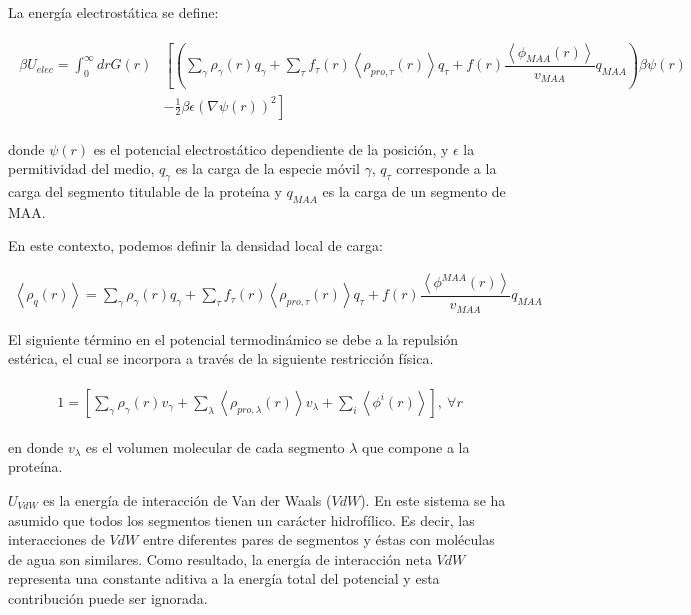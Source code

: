 
La energ\'ia electrost\'atica se define:

\begin{align}
	\begin{aligned}
		\beta U_{elec}= \int_0^\infty drG(r)&\left[\left(\sum_{\gamma } {\rho_\gamma(r) q_\gamma + \sum_\tau{f_\tau(r) \left<\rho_{pro,\tau}(r)\right> q_\tau} +  f(r)\dfrac{\left<\phi_{MAA}(r)\right>}{v_{MAA}}q_{MAA}}\right)\beta\psi(r) \right. \\ &\left.-\frac{1}{2}\beta\epsilon(\nabla\psi(r))^2 \right]
	\end{aligned}
\end{align} 

\noindent donde $\psi(r)$ es el potencial electrost\'atico dependiente de la posici\'on, y $\epsilon$ la permitividad del medio, $q_\gamma$ es la carga de la especie m\'ovil $\gamma$, $q_\tau$ corresponde a la carga del segmento titulable de la prote\'ina y $q_{MAA}$ es la carga de un segmento de MAA.

En este contexto, podemos definir la densidad local de carga: 

\begin{align}
	\left<\rho_q(r)\right> = \sum_{\gamma } {\rho_\gamma(r) q_\gamma + \sum_\tau{f_\tau(r) \left<\rho_{pro,\tau}(r)\right> q_\tau} +  f(r)\dfrac{\left<\phi^{MAA}(r)\right>}{v_{MAA}}q_{MAA}}
	\label{eq:esf:rho-charge}
\end{align}  
             
El siguiente t\'ermino en el potencial termodin\'amico se debe a la repulsi\'on est\'erica, el cual se incorpora a trav\'es de la siguiente restricci\'on f\'isica.

\begin{align}
	\begin{aligned}
		1=  {\left[\sum_{\gamma}\rho_\gamma(r) v_\gamma + \sum_\lambda{\left<\rho_{pro,\lambda}(r)\right>v_\lambda} + \sum_i{\left<\phi^i(r)\right>}\right]},~ \forall r
	\end{aligned}
	\label{eq:esf:constraint}
\end{align}


\noindent en donde $v_\lambda$  es el volumen molecular de cada segmento $\lambda$  que compone a la prote\'ina.



$U_{VdW}$ es la energ\'ia de interacci\'on de Van der Waals ($VdW$). En este sistema se ha asumido que todos los segmentos tienen un car\'acter hidrof\'ilico. Es decir, las interacciones de $VdW$ entre diferentes pares de segmentos y \'estas con mol\'eculas de agua son similares. Como resultado, la energ\'ia de interacci\'on neta $VdW$ representa una constante aditiva a la energ\'ia total del potencial y esta contribuci\'on puede ser ignorada. 



